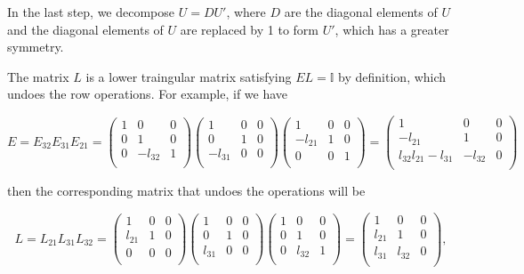 \documentclass[a4paper,12pt]{report}
\begin{document}
In the last step, we decompose \(U = DU'\), where \(D\) are the diagonal elements of \(U\) and the diagonal elements of \(U\) are replaced by 1 to form \(U'\), which has a greater symmetry.  

The matrix \(L\) is a lower traingular matrix satisfying \(EL = \mathbb{I}\) by definition, which undoes the row operations. For example, if we have 

\begin{equation}
    E = E_{32}E_{31}E_{21}    = \begin{pmatrix}
        1 & 0 &  0 \\
        0 & 1 &  0 \\
        0 & -l_{32}  &  1 \\
    \end{pmatrix}\begin{pmatrix}
        1 & 0 &  0 \\
        0 & 1 &  0 \\
        -l_{31}  & 0 &  0 \\
    \end{pmatrix}\begin{pmatrix}
        1 & 0 &  0 \\
        -l_{21} & 1 &  0 \\
        0 & 0 &  1 \\
    \end{pmatrix} = \begin{pmatrix}
        1 & 0 &  0 \\
        -l_{21}  & 1 &  0 \\
        l_{32}l_{21}-l_{31} & -l_{32}  &  0 \\
    \end{pmatrix}
\end{equation}

then the corresponding matrix that undoes the operations will be 

\begin{equation}
    L = L_{21}L_{31}L_{32} = \begin{pmatrix}
        1 & 0 &  0 \\
        l_{21}  & 1 &  0 \\
        0 & 0 &  0 \\
    \end{pmatrix}\begin{pmatrix}
        1 & 0 &  0 \\
        0 & 1 &  0 \\
        l_{31}  & 0 &  0 \\
    \end{pmatrix}\begin{pmatrix}
        1 & 0 &  0 \\
        0 & 1 &  0 \\
        0 & l_{32} &  1 \\
    \end{pmatrix} = \begin{pmatrix}
        1 & 0 &  0 \\
        l_{21}  & 1 &  0 \\
        l_{31}  & l_{32}  &  0 \\
    \end{pmatrix},
\end{equation}
\end{document}
